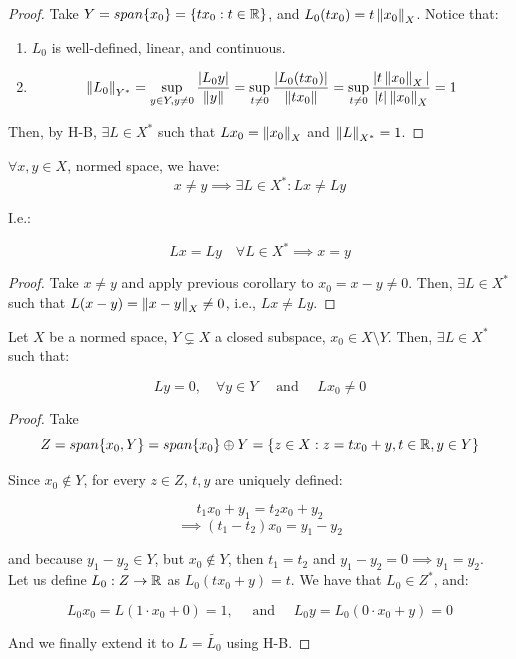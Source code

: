 \begin{proof}
    Take $Y = span \{x_0\} = \{t x_0 : t \in \mathbb{R}\}$, and $L_0(t x_0) = t \left\|x_0\right\|_X$.
    Notice that:
    \begin{enumerate}
        \item $L_0$ is well-defined, linear, and continuous.
        \item 
        $$\left\|L_0\right\|_{Y^*} = \sup_{y \in Y, y \neq 0} \frac{|L_0 y|}{\left\|y\right\|} = \sup_{t \neq 0} \frac{|L_0(tx_0)|}{\left\|tx_0\right\|} = \sup_{t \neq 0} \frac{|t \left\|x_0\right\|_X|}{|t| \left\|x_0\right\|_X} = 1$$
    \end{enumerate}

    Then, by H-B, $\exists L \in X^*$ such that $L x_0 = \left\|x_0\right\|_X$ and $\left\|L\right\|_{X^*} = 1$.
\end{proof}

\begin{fcorollary}
    $\forall x,y \in X$, normed space, we have:
    $$x \neq y \implies \exists L \in X^*: Lx \neq Ly$$

    I.e.:

    $$Lx = Ly \quad \forall L \in X^* \implies x = y$$
    
\end{fcorollary}

\begin{proof}
    Take $x \neq y$ and apply previous corollary to $x_0 = x - y \neq 0$. Then,
    $\exists L \in X^*$ such that $L(x-y) = \left\|x-y\right\|_X \neq 0$, i.e., $Lx \neq Ly$.
\end{proof}

\begin{fcorollary}
    Let $X$ be a normed space, $Y \subsetneq X$ a closed subspace,
    $x_0 \in X \setminus Y$. Then, $\exists L \in X^*$ such that: 

    $$Ly = 0, \quad \forall y \in Y \quad \text{ and } \quad Lx_0 \neq 0$$
    
\end{fcorollary}

\begin{proof}
    Take 
    $$Z = span \{x_0, Y\} = span \{x_0\} \oplus Y = \{z \in X: z = t x_0 + y, t \in \mathbb{R}, y \in Y\}$$

    Since $x_0 \notin Y$, for every $z \in Z$, $t, y$ are uniquely defined:

    $$t_1 x_0 + y_1 = t_2 x_0 + y_2$$ 
    $$\implies (t_1 - t_2) x_0 = y_1 - y_2$$ 

    and because $y_1 - y_2 \in Y$, but $x_0 \notin Y$, then $t_1 = t_2$ and $y_1 - y_2 = 0 \implies y_1 = y_2$.\\

    Let us define $L_0 : Z \to \mathbb{R}$ as $L_0(t x_0 + y) = t$. We have that
    $L_0 \in Z^*$, and:

    $$L_0 x_0 = L(1 \cdot x_0 + 0) = 1, \quad \text{ and } \quad L_0 y = L_0 (0 \cdot x_0 + y) = 0$$

    And we finally extend it to $L = \tilde{L_0}$ using H-B.

\end{proof}

